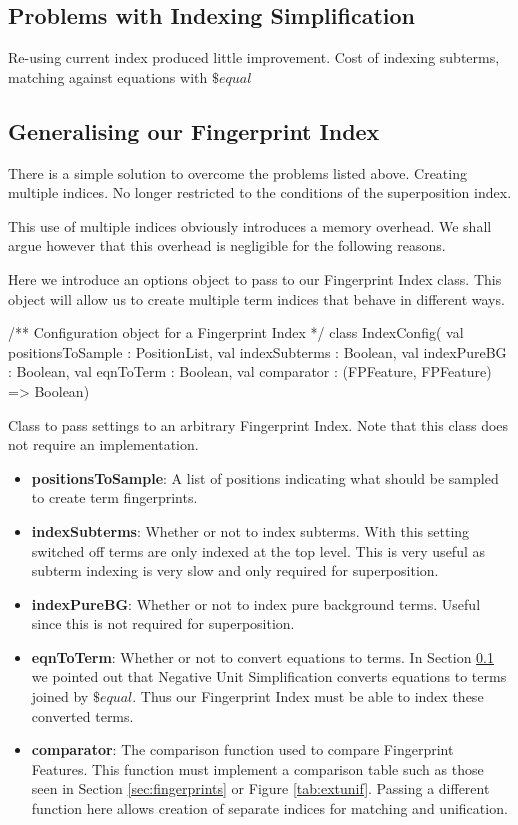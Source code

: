 \subsection{Problems with Indexing Simplification}
\label{sec:simpprob}
Re-using current index produced little improvement. Cost of indexing
subterms, matching against equations with $\$equal$

\subsection{Generalising our Fingerprint Index}
\label{sec:config}

There is a simple solution to overcome the problems listed above. Creating multiple
indices. No longer restricted to the conditions of the superposition index.

This use of multiple indices obviously introduces a memory overhead. We
shall argue however that this overhead is negligible for the following reasons.

Here we introduce an options object to pass to our Fingerprint Index class.
This object will allow us to create multiple term indices that behave in different
ways.

\begin{listing}[H]
\begin{scalacode}
/** Configuration object for a Fingerprint Index */
class IndexConfig(
  val positionsToSample : PositionList,
  val indexSubterms     : Boolean,
  val indexPureBG       : Boolean,
  val eqnToTerm         : Boolean,
  val comparator        : (FPFeature, FPFeature) => Boolean)
\end{scalacode}
\caption{Class to pass settings to an arbitrary Fingerprint Index. Note that
this class does not require an implementation.}
\label{lst:subterms}
\end{listing}

\begin{itemize}
\item \textbf{positionsToSample}: A list of positions indicating what should be sampled
to create term fingerprints.
\item \textbf{indexSubterms}: Whether or not to index subterms. With this setting switched
off terms are only indexed at the top level. This is very useful as subterm indexing
is very slow and only required for superposition.
\item \textbf{indexPureBG}: Whether or not to index pure background terms. Useful
since this is not required for superposition.
\item \textbf{eqnToTerm}: Whether or not to convert equations to terms. In Section
\ref{sec:simpprob} we pointed out that Negative Unit Simplification
converts equations to terms joined by $\$equal$. Thus our Fingerprint Index
must be able to index these converted terms.
\item \textbf{comparator}: The comparison function used to compare Fingerprint Features.
This function must implement a comparison table such as those seen in Section 
\ref{sec:fingerprints} or Figure \ref{tab:extunif}. Passing a different
function here allows creation of separate indices for matching and unification.
\end{itemize}


